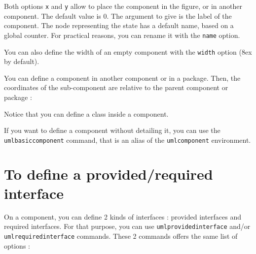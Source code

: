 \documentclass[a4paper,11pt]{report}
\newcommand{\inputTikZ}[1]{%
  }%
\newcommand{\inputTikZ}[1]{%
    \texttt{[image: fig/\#1.pdf]}%
  }%
\begin{document}
\medskip

Both options {\tt x} and {\tt y} allow to place the component in the figure, or in another component. The default value is 0. 
The argument to give is the label of the component. The node representing the state has a default name, based on a global counter. For practical reasons, you can rename it with the {\tt name} option.

\medskip

You can also define the width of an empty component with the {\tt width} option (8ex by default).

\medskip

You can define a component in another component or in a package. Then, the coordinates of the sub-component are relative to the parent component or package :

\medskip

\begin{minipage}{0.51\textwidth}

\end{minipage}
\begin{minipage}{0.49\textwidth}
\begin{center}
\inputTikZ{componentinner}
\end{center}
\end{minipage}

\medskip

Notice that you can define a class inside a component.

\medskip

If you want to define a component without detailing it, you can use the {\tt umlbasiccomponent} command, that is an alias of the {\tt umlcomponent} environment.

\section{To define a provided/required interface}

On a component, you can define 2 kinds of interfaces : provided interfaces and required interfaces. For that purpose, you can use {\tt umlprovidedinterface} and/or {\tt umlrequiredinterface} commands.
These 2 commands offers the same list of options :

\medskip

\begin{minipage}{0.45\textwidth}

\end{minipage}
\begin{minipage}{0.55\textwidth}
\begin{center}
\inputTikZ{componentinterface}
\end{center}
\end{minipage}
\end{document}
